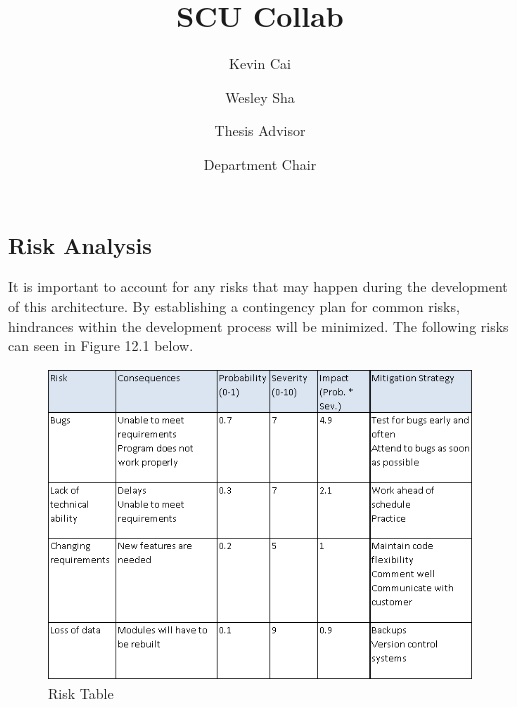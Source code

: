 \documentclass{scu-thesis}
\author{Kevin Cai}
\author{Wesley Sha}
\title{SCU Collab}
\begin{document}
\frontmatter
\signature{Thesis Advisor}
\signature{Department Chair}

\maketitle



\tableofcontents
\listoffigures

\mainmatter













\appendix
\appendixpage
\addappheadtotoc
\begin{appendices}
	\section{Risk Analysis}
	It is important to account for any risks that may happen during the development of this architecture. By establishing a contingency plan for common risks, hindrances within the development process will be minimized. The following risks can seen in Figure 12.1 below.
	
	\begin{figure}[h]
		\includegraphics[width=\linewidth]{images/risk_analysis.png}
		\caption{Risk Table}
		\label{fig:risk table}
		\centering
	\end{figure}
	
	\clearpage
	\newpage
	

\end{appendices}
\end{document}
